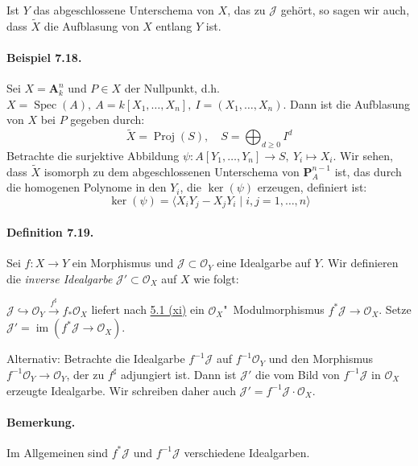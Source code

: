 Ist $Y$ das abgeschlossene Unterschema von $X$, das zu $\mathcal{J}$ gehört, so sagen wir auch, dass $\widetilde{X}$ die Aufblasung von $X$ entlang $Y$ ist.

\paragraph{Beispiel 7.18.}\label{7.18} Sei $X=\mathbf{A}^n_k$ und $P\in X$ der Nullpunkt, d.h. $X=\operatorname{Spec}(A),\ A=k[X_1,\ldots,X_n],\ I=(X_1,\ldots,X_n)$. Dann ist die Aufblasung von $X$ bei $P$ gegeben durch:
\[\widetilde{X}=\operatorname{Proj}(S),\quad S=\bigoplus_{d\geq 0}I^d\]
Betrachte die surjektive Abbildung $\psi:A[Y_1,\ldots,Y_n]\to S,\ Y_i\mapsto X_i$. Wir sehen, dass $\widetilde{X}$ isomorph zu dem abgeschlossenen Unterschema von $\mathbf{P}_A^{n-1}$ ist, das durch die homogenen Polynome in den $Y_i$, die $\ker(\psi)$ erzeugen, definiert ist:
\[\ker(\psi)=\langle X_iY_j-X_jY_i\mid i,j=1,\ldots,n\rangle\]

\paragraph{Definition 7.19.}\label{7.19} Sei $f:X\to Y$ ein Morphismus und $\mathcal{J}\subset\mathcal{O}_Y$ eine Idealgarbe auf $Y$. Wir definieren die \textit{inverse Idealgarbe} $\mathcal{J}'\subset\mathcal{O}_X$ auf $X$ wie folgt:

$\mathcal{J}\hookrightarrow\mathcal{O}_Y\stackrel{f^\sharp}{\to}f_\ast\mathcal{O}_X$ liefert nach \hyperref[5.1]{5.1 (xi)} ein $\mathcal{O}_X$"~Modulmorphismus $f^\ast\mathcal{J}\to\mathcal{O}_X$. Setze $\mathcal{J}'=\operatorname{im}(f^\ast\mathcal{J}\to\mathcal{O}_X)$.

Alternativ: Betrachte die Idealgarbe $f^{-1}\mathcal{J}$ auf $f^{-1}\mathcal{O}_Y$ und den Morphismus $f^{-1}\mathcal{O}_Y\to \mathcal{O}_Y$, der zu $f^\sharp$ adjungiert ist. Dann ist $\mathcal{J}'$ die vom Bild von $f^{-1}\mathcal{J}$ in $\mathcal{O}_X$ erzeugte Idealgarbe. Wir schreiben daher auch $\mathcal{J}'=f^{-1}\mathcal{J}\cdot\mathcal{O}_X$.

\paragraph{Bemerkung.} Im Allgemeinen sind $f^\ast\mathcal{J}$ und $f^{-1}\mathcal{J}$ verschiedene Idealgarben.

